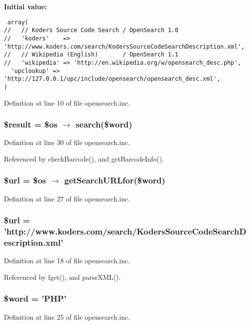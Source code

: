 \textbf{Initial value:}

\begin{Code}\begin{verbatim} array(
//   // Koders Source Code Search / OpenSearch 1.0
//   'koders'    => 'http://www.koders.com/search/KodersSourceCodeSearchDescription.xml',
//   // Wikipedia (English)       / OpenSearch 1.1
//   'wikipedia' => 'http://en.wikipedia.org/w/opensearch_desc.php',
  'upclookup' => 'http://127.0.0.1/upc/include/opensearch/opensearch_desc.xml',
)
\end{verbatim}
\end{Code}


Definition at line 10 of file opensearch.inc.\hypertarget{opensearch_8inc_112ef069ddc0454086e3d1e6d8d55d07}{
\subsubsection{\setlength{\rightskip}{0pt plus 5cm}\$result = \$os $\rightarrow$ search(\$word)}}
\label{opensearch_8inc_112ef069ddc0454086e3d1e6d8d55d07}




Definition at line 30 of file opensearch.inc.

Referenced by checkBarcode(), and getBarcodeInfo().\hypertarget{opensearch_8inc_cf215f34a917d014776ce684a9ee8909}{
\subsubsection{\setlength{\rightskip}{0pt plus 5cm}\$url = \$os $\rightarrow$ getSearchURLfor(\$word)}}
\label{opensearch_8inc_cf215f34a917d014776ce684a9ee8909}




Definition at line 27 of file opensearch.inc.\hypertarget{opensearch_8inc_cf215f34a917d014776ce684a9ee8909}{
\subsubsection{\setlength{\rightskip}{0pt plus 5cm}\$url = 'http://www.koders.com/search/KodersSourceCodeSearchDescription.xml'}}
\label{opensearch_8inc_cf215f34a917d014776ce684a9ee8909}




Definition at line 18 of file opensearch.inc.

Referenced by fget(), and parseXML().\hypertarget{opensearch_8inc_5d7b6a696c068811c70679ceb91ecc93}{
\subsubsection{\setlength{\rightskip}{0pt plus 5cm}\$word = 'PHP'}}
\label{opensearch_8inc_5d7b6a696c068811c70679ceb91ecc93}




Definition at line 25 of file opensearch.inc.